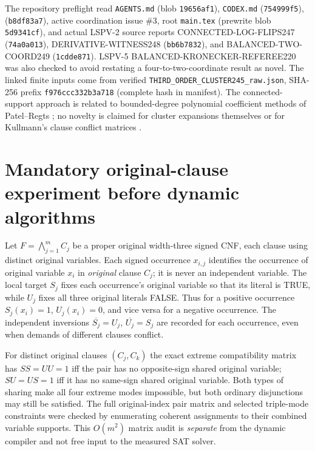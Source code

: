 \documentclass[11pt]{article}
\begin{document}
The repository preflight read \texttt{AGENTS.md} (blob \texttt{19656af1}), \texttt{CODEX.md} (\texttt{754999f5}),  (\texttt{b8df83a7}), active coordination issue \#3, root \texttt{main.tex} (prewrite blob \texttt{5d9341cf}), and actual LSPV-2 source reports CONNECTED-LOG-FLIPS247 (\texttt{74a0a013}), DERIVATIVE-WITNESS248 (\texttt{bb6b7832}), and BALANCED-TWO-COORD249 (\texttt{1cdde871}). LSPV-5 BALANCED-KRONECKER-REFEREE220 was also checked to avoid restating a four-to-two-coordinate result as novel. The linked finite inputs come from verified \texttt{THIRD\_ORDER\_CLUSTER245\_raw.json}, SHA-256 prefix \texttt{f976ccc332b3a718} (complete hash in manifest). The connected-support approach is related to bounded-degree polynomial coefficient methods of Patel--Regts \cite{PatelRegts2019,PatelRegts2017}; no novelty is claimed for cluster expansions themselves or for Kullmann's clause conflict matrices \cite{Kullmann2003}.

\section{Mandatory original-clause experiment before dynamic algorithms}
Let $F=\bigwedge_{j=1}^m C_j$ be a proper original width-three signed CNF, each clause using distinct original variables. Each signed occurrence $x_{i,j}$ identifies the occurrence of original variable $x_i$ in \emph{original} clause $C_j$; it is never an independent variable. The local target $S_j$ fixes each occurrence's original variable so that its literal is TRUE, while $U_j$ fixes all three original literals FALSE. Thus for a positive occurrence $S_j(x_i)=1$, $U_j(x_i)=0$, and vice versa for a negative occurrence. The independent inversions $\overline{S_j}=U_j$, $\overline{U_j}=S_j$ are recorded for each occurrence, even when demands of different clauses conflict.

For distinct original clauses $(C_j,C_k)$ the exact extreme compatibility matrix has $SS=UU=1$ iff the pair has no opposite-sign shared original variable; $SU=US=1$ iff it has no same-sign shared original variable. Both types of sharing make all four extreme modes impossible, but both ordinary disjunctions may still be satisfied. The full original-index pair matrix and selected triple-mode constraints were checked by enumerating coherent assignments to their combined variable supports. This $O(m^2)$ matrix audit is \emph{separate} from the dynamic compiler and not free input to the measured SAT solver.
\end{document}
